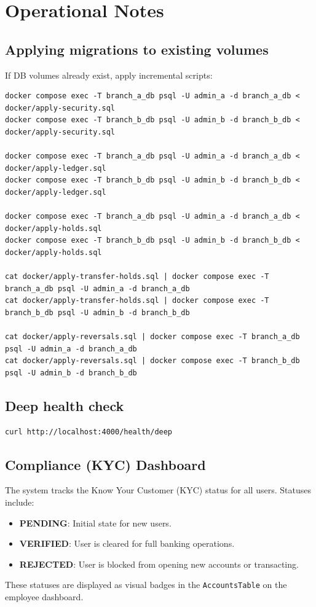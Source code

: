 \section{Operational Notes}
\subsection{Applying migrations to existing volumes}
If DB volumes already exist, apply incremental scripts:
\begin{lstlisting}[style=bash]
docker compose exec -T branch_a_db psql -U admin_a -d branch_a_db < docker/apply-security.sql
docker compose exec -T branch_b_db psql -U admin_b -d branch_b_db < docker/apply-security.sql

docker compose exec -T branch_a_db psql -U admin_a -d branch_a_db < docker/apply-ledger.sql
docker compose exec -T branch_b_db psql -U admin_b -d branch_b_db < docker/apply-ledger.sql

docker compose exec -T branch_a_db psql -U admin_a -d branch_a_db < docker/apply-holds.sql
docker compose exec -T branch_b_db psql -U admin_b -d branch_b_db < docker/apply-holds.sql

cat docker/apply-transfer-holds.sql | docker compose exec -T branch_a_db psql -U admin_a -d branch_a_db
cat docker/apply-transfer-holds.sql | docker compose exec -T branch_b_db psql -U admin_b -d branch_b_db

cat docker/apply-reversals.sql | docker compose exec -T branch_a_db psql -U admin_a -d branch_a_db
cat docker/apply-reversals.sql | docker compose exec -T branch_b_db psql -U admin_b -d branch_b_db
\end{lstlisting}

\subsection{Deep health check}
\begin{lstlisting}[style=bash]
curl http://localhost:4000/health/deep
\end{lstlisting}
\subsection{Compliance (KYC) Dashboard}
The system tracks the Know Your Customer (KYC) status for all users. Statuses include:
\begin{itemize}
    \item \textbf{PENDING}: Initial state for new users.
    \item \textbf{VERIFIED}: User is cleared for full banking operations.
    \item \textbf{REJECTED}: User is blocked from opening new accounts or transacting.
\end{itemize}
These statuses are displayed as visual badges in the \texttt{AccountsTable} on the employee dashboard.

